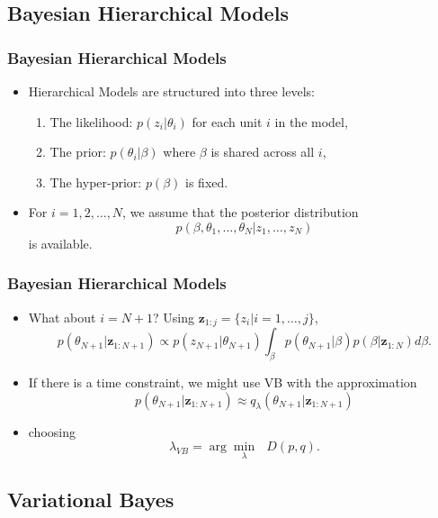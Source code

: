 \documentclass[11pt]{beamer}\usepackage[]{graphicx}\usepackage[]{color}
\begin{document}
\subsection{Bayesian Hierarchical Models}

\begin{frame}
\frametitle{Bayesian Hierarchical Models}
\begin{itemize}
\item Hierarchical Models are structured into three levels:
\begin{enumerate}
\item The likelihood: $p(z_i | \theta_i)$ for each unit $i$ in the model,
\item The prior: $p(\theta_i | \beta)$ where $\beta$ is shared across all $i$,
\item The hyper-prior: $p(\beta)$ is fixed.
\end{enumerate}
\pause
\vspace{5mm}
\item For $i = 1, 2, \dots, N$, we assume that the posterior distribution $$p(\beta, \theta_1, \dots, \theta_N | z_1, \dots, z_N)$$ is available.
\end{itemize}
\end{frame}

\begin{frame}
\frametitle{Bayesian Hierarchical Models}
\begin{itemize}
\item What about $i = N+1$? Using $\textbf{z}_{1:j} = \{z_i | i = 1, \dots, j\}$, $$p(\theta_{N+1} |\textbf{z}_{1:N+1}) \propto p(z_{N+1} | \theta_{N+1})\int_{\beta}p(\theta_{N+1} | \beta)p(\beta | \textbf{z}_{1:N})d\beta.$$
\pause
\item If there is a time constraint, we might use VB with the approximation $$p(\theta_{N+1} |\textbf{z}_{1:N+1}) \approx q_{\lambda}(\theta_{N+1} | \textbf{z}_{1:N+1})$$
\item choosing $$\lambda_{VB} = \arg \underset{\lambda}{\min}\mbox{ }D(p, q).$$
\end{itemize}
\end{frame}

\subsection{Variational Bayes}
\end{document}
